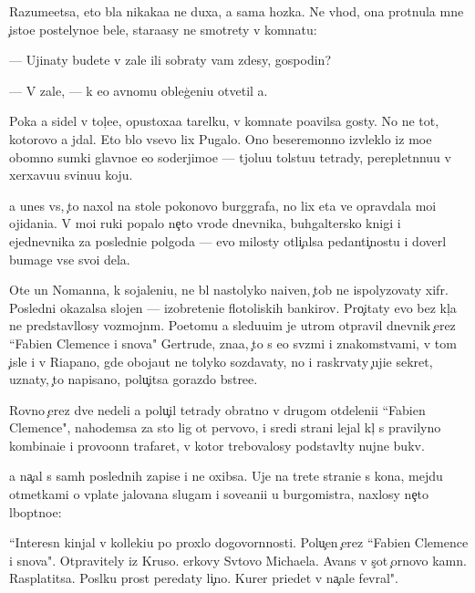 \documentclass[10pt]{book}
\begin{document}
Razume{\y}etsa, eto b{\yi}la nikaka{\y}a ne duxa, a sama hoz{\ia}{\y}ka. Ne vhod{\ia}, ona prot{\ia}nula mne {\c}isto{\y}e postelyno{\y}e bel{\y}e, stara{\y}asy ne smotrety v komnatu:

— Ujinaty budete v zale ili sobraty vam zdesy, gospodin?

— V zale, — k {\y}e{\y}o {\y}avnomu obleg{\c}eni{\y}u otvetil {\y}a.

Poka {\y}a sidel v tol{\c}e{\y}e, opustoxa{\y}a tarelku, v komnate po{\y}avilsa gosty. No ne tot, kotorovo {\y}a jdal. Eto b{\yi}lo vsevo lix Pugalo. Ono bes{\q}eremonno izvleklo iz mo{\y}e{\y} ob{\y}omno{\y} sumki glavno{\y}e {\y}e{\y}o soderjimo{\y}e — t{\ia}jolu{\y}u tolstu{\y}u tetrady, pereplet{\e}nnu{\y}u v xerxavu{\y}u svinu{\y}u koju.

{\Y}a unes vs{\e}, {\c}to naxol na stole poko{\y}novo burggrafa, no lix eta ve{\x} opravdala mo{\y}i ojidani{\y}a. V mo{\y}i ruki popalo ne{\c}to vrode dnevnika, buhgaltersko{\y} knigi i {\y}ejednevnika za posledni{\y}e polgoda — {\y}evo milosty otli{\c}alsa pedanti{\c}nost{\y}u i dover{\ia}l bumage vse svo{\y}i dela.

Ote{\q} un Nomanna, k sojaleni{\y}u, ne b{\yi}l nastolyko naiven, {\c}tob{\yi} ne ispolyzovaty xifr. Posledni{\y} okazalsa slojen — izobreteni{\y}e flotoli{\y}skih bankirov. Pro{\c}itaty {\y}evo bez kl{\iu}{\c}a ne predstavl{\ia}losy vozmojn{\yi}m. Poetomu {\y}a sledu{\y}u{\x}im je utrom otpravil dnevnik {\c}erez ``Fabien Clemence i s{\yi}nov{\y}a" Gertrude, zna{\y}a, {\c}to s {\y}e{\y}o sv{\ia}z{\ia}mi i znakomstvami, v tom {\c}isle i v Riapano, gde oboja{\y}ut ne tolyko sozdavaty, no i raskr{\yi}vaty {\c}uji{\y}e sekret{\yi}, uznaty, {\c}to napisano, polu{\c}itsa gorazdo b{\yi}stre{\y}e.

Rovno {\c}erez dve nedeli {\y}a polu{\c}il tetrady obratno v drugom otdeleni{\y}i ``Fabien Clemence", nahod{\ia}{\x}emsa za sto lig ot pervovo, i sredi strani{\q} lejal kl{\iu}{\c} s pravilyno{\y} kombina{\q}i{\y}e{\y} i provo{\x}onn{\yi}{\y} trafaret, v kotor{\yi}{\y} trebovalosy podstavl{\ia}ty nujn{\yi}{\y}e bukv{\yi}.

{\Y}a na{\c}al s sam{\yi}h poslednih zapise{\y} i ne oxibsa. Uje na tret{\y}e{\y} strani{\q}e s kon{\q}a, mejdu otmetkami o v{\yi}plate jalovan{\y}a slugam i sove{\x}ani{\y}i u burgomistra, naxlosy ne{\c}to l{\iu}bop{\yi}tno{\y}e:

``Interesn{\yi}{\y} kinjal v kollek{\q}i{\y}u po proxlo{\y} dogovor{\e}nnosti. Polu{\c}en {\c}erez ``Fabien Clemence i s{\yi}nov{\y}a". Otpravitely iz Kruso. {\Q}erkovy Sv{\ia}tovo Michaela. Avans v s{\c}ot {\c}ornovo kamn{\ia}. Rasplatitsa. Pos{\yi}lku pros{\ia}t peredaty li{\c}no. Kur{\y}er pri{\y}edet v na{\c}ale fevral{\ia}".
\end{document}
